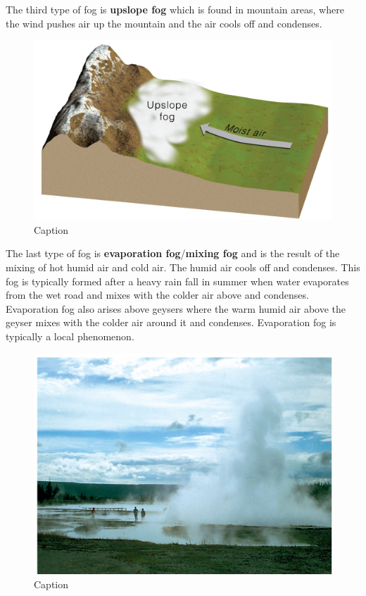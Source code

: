 \documentclass[12pt,oneside]{book}
\begin{document}
The third type of fog is \textbf{upslope fog} which is found in mountain
areas, where the wind pushes air up the mountain and the air cools off
and condenses.

\begin{figure}

{\centering \includegraphics[width=0.8\linewidth]{figures/Figure244} 

}

\caption{Caption}\label{fig:Fog4}
\end{figure}

The last type of fog is \textbf{evaporation fog}/\textbf{mixing fog} and
is the result of the mixing of hot humid air and cold air. The humid air
cools off and condenses. This fog is typically formed after a heavy rain
fall in summer when water evaporates from the wet road and mixes with
the colder air above and condenses. Evaporation fog also arises above
geysers where the warm humid air above the geyser mixes with the colder
air around it and condenses. Evaporation fog is typically a local
phenomenon.

\begin{figure}

{\centering \includegraphics[width=0.8\linewidth]{figures/Figure245} 

}

\caption{Caption}\label{fig:Fog5}
\end{figure}
\end{document}
